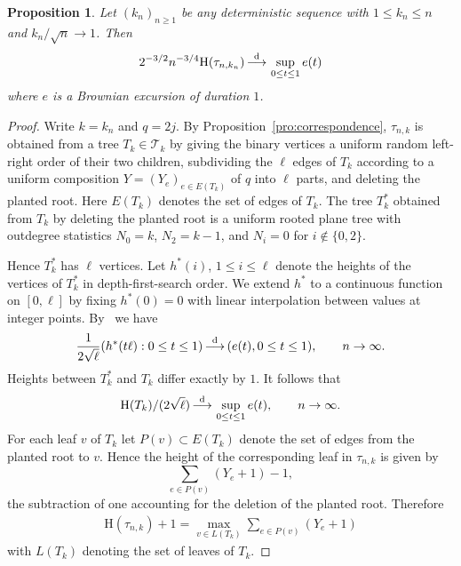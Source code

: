 \documentclass[english,11pt]{smfart}
\newcommand{\convdis}{\,{\buildrel \mathrm{d} \over \longrightarrow}\,}
\newcommand{\He}{\mathrm{H}}
\newcommand{\cT}{\mathcal{T}}
\newtheorem{proposition}[theorem]{Proposition}
\numberwithin{equation}{section}
\begin{document}
\begin{proposition}
	Let $(k_n)_{n\ge1}$ be any deterministic sequence with $1\le k_n\le n$ and
	$k_n/\sqrt n\to1$. Then
	\[
		2^{-3/2}n^{-3/4}\He(\tau_{n,k_n}) \convdis \sup_{0\le t\le1} e(t)
	\]
	where $e$ is a Brownian excursion of duration $1$.
\end{proposition}
\begin{proof}
	Write $k = k_n$ and $q = 2j$. By Proposition~\ref{pro:correspondence}, $\tau_{n,k}$ is obtained from a tree $T_k \in \cT_k$ by giving the binary vertices a uniform random left-right order of their two children, subdividing the $\ell$ edges of $T_k$ according to a uniform composition $Y=(Y_e)_{e\in E(T_k)}$ of $q$ into $\ell$ parts, and deleting the planted root. Here $E(T_k)$ denotes the set of edges of $T_k$. The tree $T^*_k$ obtained from $T_k$ by deleting the planted root is a uniform rooted plane tree with outdegree statistics $N_0 = k$, $N_2 = k-1$, and $N_i=0$ for $i \notin \{0,2\}$.
    \smallskip
    
	Hence $T^*_k$ has $\ell$ vertices. Let $h^*(i)$, $1 \le i \le \ell$ denote the heights of the vertices of $T^*_k$ in depth-first-search order. We extend $h^*$ to a continuous function on $[0, \ell]$ by fixing $h^*(0)=0$ with linear interpolation between values at integer points. By~\cite[Thm.~3]{zbMATH06294776} we have
	\[
		\frac{1}{2 \sqrt{\ell}} (h^*(t\ell) : 0 \le t \le 1) \convdis (e(t), 0 \le t \le 1), \qquad n \to \infty.
	\]
	Heights between $T^*_k$ and $T_k$ differ exactly by $1$. It follows that
	\begin{align}
		\label{eq:h1}
		\He(T_k) / (2 \sqrt{\ell}) \convdis \sup_{0 \le t \le 1} e(t), \qquad n \to \infty.
	\end{align}
	For each leaf $v$ of $T_k$ let $P(v) \subset E(T_k)$ denote the set of edges from the planted root to $v$. Hence the height of the corresponding leaf in $\tau_{n,k}$ is given by
	\[
		\sum_{e\in P(v)} (Y_e + 1) - 1,
	\]
	the subtraction of one accounting for the deletion of the planted root. Therefore
	\begin{align}
		\label{eq:h2}
		\He(\tau_{n,k}) + 1 = \max_{v\in L(T_k)} \sum_{e\in P(v)}(Y_e + 1)
	\end{align}
	with $L(T_k)$ denoting the set of leaves of $T_k$.
	

\end{proof}
\end{document}

